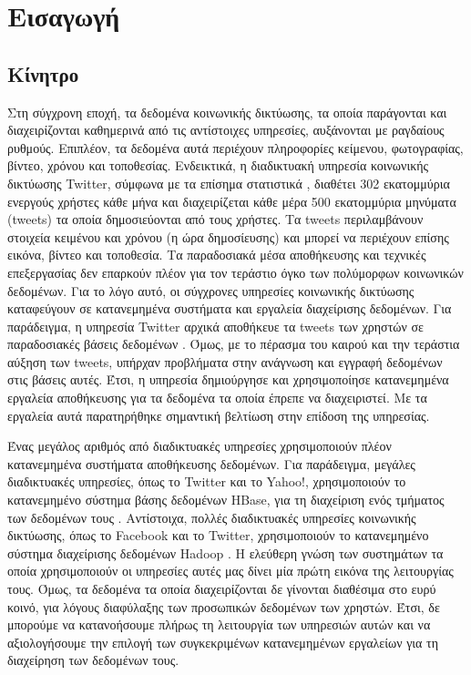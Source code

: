 \chapter{Εισαγωγή}

\section{Κίνητρο}

Στη σύγχρονη εποχή, τα δεδομένα κοινωνικής δικτύωσης, τα οποία παράγονται και \linebreak 
διαχειρίζονται καθημερινά από τις αντίστοιχες υπηρεσίες, αυξάνονται με ραγδαίους ρυθμούς. 
Επιπλέον, τα δεδομένα αυτά περιέχουν πληροφορίες κείμενου, φωτογραφίας, βίντεο, χρόνου και τοποθεσίας. Ενδεικτικά, η διαδικτυακή υπηρεσία κοινωνικής δικτύωσης Twitter, 
σύμφωνα με τα επίσημα στατιστικά \cite{1}, διαθέτει 302 εκατομμύρια ενεργούς χρήστες κάθε μήνα και διαχειρίζεται κάθε μέρα 500 εκατομμύρια μηνύματα (tweets) 
τα οποία δημοσιεύονται από τους χρήστες. Τα tweets περιλαμβάνουν στοιχεία κειμένου και χρόνου (η ώρα δημοσίευσης) και μπορεί να περιέχουν επίσης 
εικόνα, βίντεο και τοποθεσία. Τα παραδοσιακά μέσα αποθήκευσης και τεχνικές επεξεργασίας δεν επαρκούν πλέον για τον τεράστιο όγκο των πολύμορφων 
κοινωνικών δεδομένων. Για το λόγο αυτό, οι σύγχρονες υπηρεσίες κοινωνικής δικτύωσης 
καταφεύγουν σε κατανεμημένα συστήματα και εργαλεία διαχείρισης δεδομένων. Για παράδειγμα, η υπηρεσία Twitter αρχικά 
αποθήκευε τα tweets των χρηστών σε παραδοσιακές βάσεις δεδομένων \cite{2}. Όμως, με το πέρασμα του καιρού και την τεράστια αύξηση των 
tweets, υπήρχαν προβλήματα στην ανάγνωση και εγγραφή δεδομένων στις βάσεις αυτές. Έτσι, η υπηρεσία δημιούργησε και χρησιμοποίησε κατανεμημένα εργαλεία αποθήκευσης 
για τα δεδομένα τα οποία έπρεπε να διαχειριστεί. Με τα εργαλεία αυτά παρατηρήθηκε σημαντική βελτίωση στην επίδοση της υπηρεσίας. 

Ένας μεγάλος αριθμός από διαδικτυακές υπηρεσίες χρησιμοποιούν πλέον κατανεμημένα \linebreak συστήματα αποθήκευσης δεδομένων. Για παράδειγμα, μεγάλες διαδικτυακές 
υπηρεσίες, όπως το Twitter και το Yahoo!, χρησιμοποιούν το κατανεμημένο σύστημα βάσης δεδομένων HBase, για τη διαχείριση 
ενός τμήματος των δεδομένων τους \cite{4}. Αντίστοιχα, πολλές διαδικτυακές υπηρεσίες κοινωνικής δικτύωσης, όπως το Facebook και το Twitter, 
χρησιμοποιούν το \linebreak κατανεμημένο σύστημα διαχείρισης δεδομένων Hadoop \cite{6}. Η ελεύθερη γνώση των \linebreak 
συστημάτων τα οποία χρησιμοποιούν οι 
υπηρεσίες αυτές μας δίνει μία πρώτη εικόνα της \linebreak 
λειτουργίας τους. Όμως, τα δεδομένα τα οποία διαχειρίζονται δε γίνονται διαθέσιμα στο ευρύ κοινό, για λόγους 
διαφύλαξης των προσωπικών δεδομένων των χρηστών. Έτσι, δε μπορούμε να κατανοήσουμε πλήρως τη λειτουργία των υπηρεσιών αυτών και να αξιολογήσουμε την επιλογή 
των συγκεκριμένων κατανεμημένων εργαλείων για τη διαχείρηση των δεδομένων τους. 

